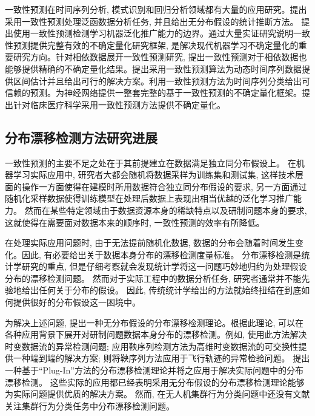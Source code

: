 一致性预测在时间序列分析, 模式识别和回归分析领域都有大量的应用研究\citep{Vineeth2019}。\citet{Lei2015}提出采用一致性预测处理泛函数据分析任务, 并且给出无分布假设的统计推断方法。 \citet{Vovk2021retrain}提出使用一致性预测检测学习机器泛化推广能力的边界。\citet{Aleksandrova2021}通过大量实证研究说明一致性预测提供完整有效的不确定量化研究框架, 是解决现代机器学习不确定量化的重要研究方向。\citet{Victor2018}针对相依数据展开一致性预测研究, 提出一致性预测对于相依数据也能够提供精确的不确定量化结果。\citet{Xu2021}提出采用一致性预测算法为动态时间序列数据提供区间估计并且给出可行的解决方案。\citet{Dashevskiy2011}利用一致性预测方法为时间序列分类给出可信赖的预测。\citet{Papadopoulos2007}为神经网络提供一整套完整的基于一致性预测的不确定量化框架\citep{Papadopoulos2008}。\citet{Janette2022}提出针对临床医疗科学采用一致性预测方法提供不确定量化。

\subsection{分布漂移检测方法研究进展}

一致性预测的主要不足之处在于其前提建立在数据满足独立同分布假设上\citep{Finetti1975}。 在机器学习实际应用中, 研究者大都会随机将数据采样为训练集和测试集, 这样技术层面的操作一方面使得在建模时所用数据符合独立同分布假设的要求, 另一方面通过随机化采样数据使得训练模型在处理后数据上表现出相当优越的泛化学习推广能力。 然而在某些特定领域由于数据资源本身的稀缺特点以及研制问题本身的要求, 这就使得在需要面对数据本来的顺序时, 一致性预测的效率有所降低。

在处理实际应用问题时, 由于无法提前随机化数据, 数据的分布会随着时间发生变化。因此, 有必要给出关于数据本身分布的漂移检测度量标准。 分布漂移检测是统计学研究的重点, 但是仔细考察就会发现统计学将这一问题巧妙地归约为处理假设分布的漂移检测问题。 然而对于实际工程中的数据分析任务, 研究者通常并不能先验地给出任何关于分布的假设。 因此, 传统统计学给出的方法就始终扭结在到底如何提供很好的分布假设这一困境中\citep{Breiman2001,Efron2020}。

为解决上述问题, \citet{Vovk2003,Vovk2021retrain}提出一种无分布假设的分布漂移检测理论。根据此理论, 可以在各种应用背景下展开对研制问题数据本身分布的漂移检测。例如, \citet{Ho2005}使用此方法解决时变数据流的异常检测问题; \citet{Ho2012}应用鞅序列检测方法为高维时变数据流的可交换性提供一种端到端的解决方案; \citet{Ho2019}则将鞅序列方法应用于飞行轨迹的异常检验问题。 \citet{Vovk2012}提出一种基于“Plug-In”方法的分布漂移检测理论并将之应用于解决实际问题中的分布漂移检测。 这些实际的应用都已经表明采用无分布假设的分布漂移检测理论能够为实际问题提供优质的解决方案。 然而, 在无人机集群行为分类问题中还没有文献关注集群行为分类任务中分布漂移检测问题。 


